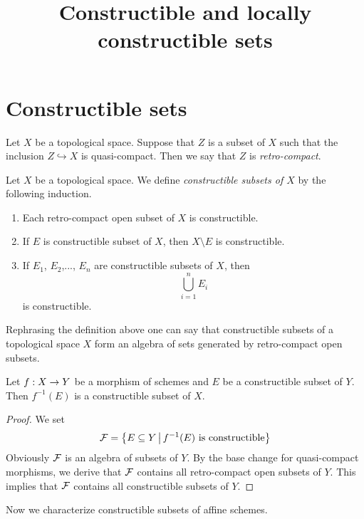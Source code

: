 



\title{Constructible and locally constructible sets}
\date{}
\maketitle

\section{Constructible sets}

\begin{definition}
Let $X$ be a topological space. Suppose that $Z$ is a subset of $X$ such that the inclusion $Z\hookrightarrow X$ is quasi-compact. Then we say that $Z$ is \textit{retro-compact}.
\end{definition}

\begin{definition}
Let $X$ be a topological space. We define \textit{constructible subsets of $X$} by the following induction.
\begin{enumerate}[label=\textbf{(\arabic*)}, leftmargin=*]
\item Each retro-compact open subset of $X$ is constructible.
\item If $E$ is constructible subset of $X$, then $X\setminus E$ is constructible. 
\item If $E_1$, $E_2$,..., $E_n$ are constructible subsets of $X$, then 
$$\bigcup_{i=1}^nE_i$$ 
is constructible.
\end{enumerate}  
\end{definition}
\noindent
Rephrasing the definition above one can say that constructible subsets of a topological space $X$ form an algebra of sets generated by retro-compact open subsets.

\begin{fact}\label{fact:constructiblepreimages}
Let $f:X\rightarrow Y$ be a morphism of schemes and $E$ be a constructible subset of $Y$. Then $f^{-1}(E)$ is a constructible subset of $X$.
\end{fact}
\begin{proof}
We set
$${\mathcal F} = \big\{E\subseteq Y\,\big|\,f^{-1}(E)\mbox{ is constructible}\big\}$$
Obviously ${\mathcal F}$ is an algebra of subsets of $Y$. By the base change for quasi-compact morphisms, we derive that ${\mathcal F}$ contains all retro-compact open subsets of $Y$. This implies that ${\mathcal F}$ contains all constructible subsets of $Y$.
\end{proof}
\noindent
Now we characterize constructible subsets of affine schemes.

